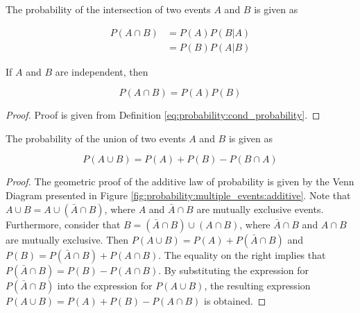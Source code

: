 \begin{theorem}
      \label{th:probability:multiple_events:multiplicative}
      The probability of the intersection of two events $A$ and $B$ is given as

      \begin{equation}
            \begin{split}
                  P(A \cap B)
                  &= P(A)P(B \vert A) \\
                  &= P(B)P(A \vert B)
            \end{split}
      \end{equation}

      If $A$ and $B$ are independent, then

      \begin{equation}
            P(A \cap B) = P(A)P(B)
      \end{equation}
\end{theorem}

\begin{proof}
      Proof is given from Definition \ref{eq:probability:cond_probability}.
\end{proof}
\vspace*{0.5cm}

\begin{theorem}
      \label{th:probability:multiple_events:additive}
      The probability of the union of two events $A$ and $B$ is given as

      \begin{equation}
            P(A \cup B) = P(A) + P(B) - P(B \cap A)
      \end{equation}
\end{theorem}

\begin{proof}
      The geometric proof of the additive law of probability is given by the Venn Diagram presented in Figure \ref{fig:probability:multiple_events:additive}. Note that $A \cup B = A \cup ( \bar{A} \cap B)$, where $A$ and $\bar{A} \cap B$ are mutually exclusive events. Furthermore, consider that $B = (\bar{A} \cap B) \cup (A \cap B)$, where $\bar{A} \cap B$ and $A \cap B$ are mutually exclusive. Then $P(A \cup B) = P(A) + P(\bar{A} \cap B)$ and $P(B) = P(\bar{A} \cap B) + P(A \cap B)$. The equality on the right implies that $P(\bar{A} \cap B) = P(B) - P(A \cap B)$. By substituting the expression for $P(\bar{A} \cap B)$ into the expression for $P(A \cup B)$, the resulting expression $P(A \cup B) = P(A) + P(B) - P(A \cap B)$ is obtained.
\end{proof}

